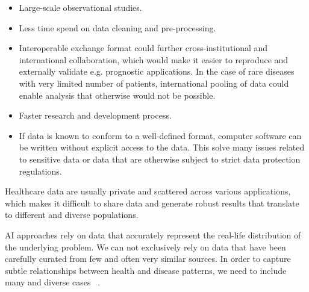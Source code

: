 \begin{itemize}
    \item Large-scale observational studies.
    \item Less time spend on data cleaning and pre-processing.
    \item Interoperable exchange format could further cross-institutional
    and international collaboration, which would make it easier 
    to reproduce and externally validate e.g. prognostic applications.
    In the case of rare diseases with very limited number of patients, 
    international pooling of data could enable analysis
    that otherwise would not be possible.
    \item Faster research and development process.
    \item If data is known to conform to a well-defined format,
    computer software can be written without explicit access to the data.
    This solve many issues related to sensitive data or
    data that are otherwise subject to strict data protection regulations.
\end{itemize}

Healthcare data are usually private and scattered across various applications,
which makes it difficult to share data and generate robust results 
that translate to different and diverse populations.

AI approaches rely on data that accurately represent
the real-life distribution of the underlying problem.
We can not exclusively rely on data that have been carefully curated 
from few and often very similar sources. 
In order to capture subtle relationships 
between health and disease patterns,
we need to include many and diverse cases~%
\autocite{riekeFuture2020}.
